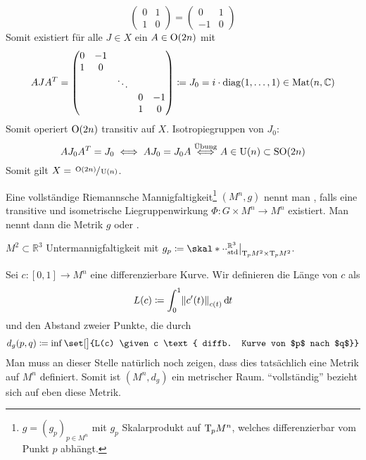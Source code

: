 \begin{beispiel*}[{name=[homogene Räume]}]
\begin{enumerate}[1)]
\[\begin{pmatrix}
				0 & 1 \\
				1 & 0
			\end{pmatrix} = \begin{pmatrix}
				0 & 1 \\ -1 & 0
			\end{pmatrix}
		\]
		Somit existiert für alle $J \in X$ ein $A \in \operatorname{O}(2n)$ mit 
		\[
			A J A^T = \begin{pmatrix}
				0 & -1 & & & \\
				1 & 0 & & & \\
				& & \ddots & & \\
				& & & 0 & -1 \\
				& & & 1 & 0
			\end{pmatrix} \coloneqq J_0 = i \cdot \operatorname{diag}(1, \ldots ,1) \in \operatorname{Mat}(n,\mathbb{C})
		\]
		Somit operiert $\operatorname{O}(2n)$ transitiv auf $X$.
		Isotropiegruppen von $J_0$:
		\[
			A J_0 A^T = J_0 \iff A J_0 = J_0 A \stackrel{\mbox{\scriptsize Übung}}{\iff} A \in \operatorname{U}(n) \subset \operatorname{SO}(2n)
		\]
		Somit gilt $X = \sfrac{\operatorname{O}(2n)}{\operatorname{U}(n)}$.
 	\end{enumerate}
\end{beispiel*}

\begin{definition}
	Eine vollständige Riemannsche Mannigfaltigkeit\footnote{$g= (g_p)_{p \in M^n}$ mit $g_p$ Skalarprodukt auf $\mathrm{T}\mkern-0.85mu_p M^n$, welches differenzierbar vom Punkt $p$ abhängt.} $(M^n,g)$ nennt man , falls eine transitive und isometrische Liegruppenwirkung $\Phi \colon G\times M^n \to M^n$ existiert.
	Man nennt dann die Metrik $g$  oder .
\end{definition}

\begin{beispiel*}
	$M^2 \subset \mathbb{R}^3$ Untermannigfaltigkeit mit $g_p \coloneqq \skal*{\cdot }{\cdot }_{\mathrm{std}}^{\mathbb{R}^3}\big|_{\Tmap_p M^2 \times \Tmap_p M^2}$.
\end{beispiel*}

Sei $c \colon [0,1] \to M^n$ eine differenzierbare Kurve. 
Wir definieren die Länge von $c$ als 
\[
	L(c) \coloneqq \int_0^1 \norm*{c'(t)}_{c(t)} \,\mathd t
\]
und den Abstand zweier Punkte, die   durch 
\[
	d_g(p,q) \coloneqq \inf \set[\big]{L(c) \given c \text{ diffb. Kurve von $p$ nach $q$}}
\]
Man muss an dieser Stelle natürlich noch zeigen, dass dies tatsächlich eine Metrik auf $M^n$ definiert.
Somit ist $(M^n,d_g)$ ein metrischer Raum.
\enquote{vollständig} bezieht sich auf eben diese Metrik.


